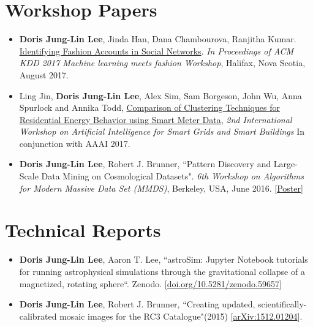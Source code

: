 \documentclass{res}
\begin{document}
\begin{resume}
\section{Workshop Papers}
\begin{itemize}
\item \textbf{Doris Jung-Lin Lee}, Jinda Han, Dana Chambourova, Ranjitha Kumar. \href{https://kddfashion2017.mybluemix.net/final_submissions/ML4Fashion_paper_21.pdf}{Identifying Fashion Accounts in Social Networks}.  \textit{In Proceedings of ACM KDD 2017 Machine learning meets fashion Workshop}, Halifax, Nova Scotia, August 2017.
\item Ling Jin, \textbf{Doris Jung-Lin Lee}, Alex Sim, Sam Borgeson, John Wu, Anna Spurlock and Annika Todd, \href{https://sdm.lbl.gov/perf/AISGSB2017-final2.pdf}{Comparison of Clustering Techniques for Residential Energy Behavior using Smart Meter Data}, \textit{2nd International Workshop on Artificial Intelligence for Smart Grids and Smart Buildings} In conjunction with AAAI 2017.
\item \textbf{Doris Jung-Lin Lee}, Robert J. Brunner, ``Pattern Discovery and Large-Scale Data Mining on Cosmological Datasets". \textit{6th Workshop on Algorithms for Modern Massive Data Set (MMDS)}, Berkeley, USA, June 2016.  [\href{http://dorisjunglinlee.com/files/MMDS_poster.pdf}{Poster}]
\end{itemize}
\vspace{-10pt}
\section{Technical Reports}
\begin{itemize}
\item \textbf{Doris Jung-Lin Lee}, Aaron T. Lee, ``astroSim: Jupyter Notebook tutorials for running astrophysical simulations through the gravitational collapse of a magnetized, rotating sphere``. Zenodo. [\href{http://doi.org/10.5281/zenodo.59657}{doi.org/10.5281/zenodo.59657}]
\item \textbf{Doris Jung-Lin Lee}, Robert J. Brunner, ``Creating updated, scientifically-calibrated mosaic images for the RC3 Catalogue"(2015) [\href{http://arxiv.org/abs/1512.01204}{arXiv:1512.01204}]. 
\end{itemize}

\end{resume}
\end{document}
